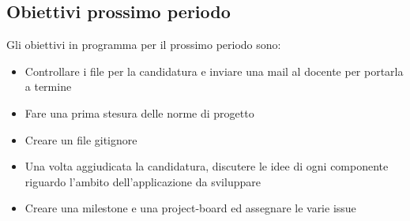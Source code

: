 \subsection{Obiettivi prossimo periodo}
Gli obiettivi in programma per il prossimo periodo sono:
\begin{itemize}
\item Controllare i file per la candidatura e inviare una mail al docente per portarla a termine
\item Fare una prima stesura delle norme di progetto
\item Creare un file gitignore
\item Una volta aggiudicata la candidatura, discutere le idee di ogni componente riguardo l'ambito dell'applicazione da sviluppare
\item Creare una milestone e una project-board ed assegnare le varie issue
\end{itemize}

